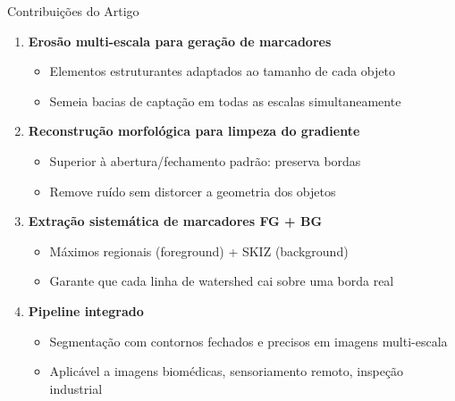 \documentclass[aspectratio=169,12pt]{beamer}
\begin{document}
\begin{frame}{Contribui\c{c}\~oes do Artigo}

\begin{enumerate}
  \item \textbf{Eros\~ao multi-escala para gera\c{c}\~ao de marcadores}
  \begin{itemize}
    \item Elementos estruturantes adaptados ao tamanho de cada objeto
    \item Semeia bacias de capta\c{c}\~ao em todas as escalas simultaneamente
  \end{itemize}

  \vspace{0.3cm}

  \item \textbf{Reconstru\c{c}\~ao morfol\'ogica para limpeza do gradiente}
  \begin{itemize}
    \item Superior \`a abertura/fechamento padr\~ao: preserva bordas
    \item Remove ru\'ido sem distorcer a geometria dos objetos
  \end{itemize}

  \vspace{0.3cm}

  \item \textbf{Extra\c{c}\~ao sistem\'atica de marcadores FG + BG}
  \begin{itemize}
    \item M\'aximos regionais (foreground) + SKIZ (background)
    \item Garante que cada linha de watershed cai sobre uma borda real
  \end{itemize}

  \vspace{0.3cm}

  \item \textbf{Pipeline integrado}
  \begin{itemize}
    \item Segmenta\c{c}\~ao com contornos fechados e precisos em imagens multi-escala
    \item Aplic\'avel a imagens biom\'edicas, sensoriamento remoto, inspe\c{c}\~ao industrial
  \end{itemize}
\end{enumerate}

\end{frame}
\end{document}
